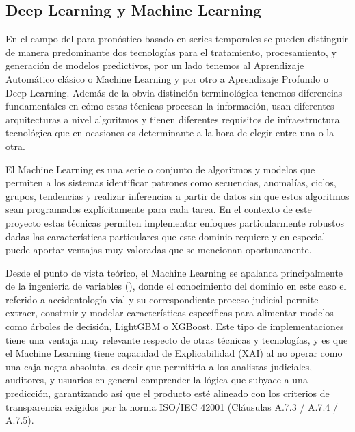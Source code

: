 \subsection{Deep Learning y Machine Learning}\label{deep-learning-y-machine-learning}

En el campo del  para pronóstico basado en series temporales se pueden distinguir de manera predominante dos tecnologías para el tratamiento, procesamiento, y generación de modelos predictivos, por un lado tenemos al Aprendizaje Automático clásico o Machine Learning y por otro a Aprendizaje Profundo o Deep Learning. Además de la obvia distinción terminológica tenemos diferencias fundamentales en cómo estas técnicas procesan la información, usan diferentes arquitecturas a nivel algoritmos y tienen diferentes requisitos de infraestructura tecnológica que en ocasiones es determinante a la hora de elegir entre una o la otra.

El Machine Learning es una serie o conjunto de algoritmos y modelos que permiten a los sistemas identificar patrones como secuencias, anomalías, ciclos, grupos, tendencias y realizar inferencias a partir de datos sin que estos algoritmos sean programados explícitamente para cada tarea. En el contexto de este proyecto estas técnicas permiten implementar enfoques particularmente robustos dadas las características particulares que este dominio requiere y en especial puede aportar ventajas muy valoradas que se mencionan oportunamente.

Desde el punto de vista teórico, el Machine Learning se apalanca principalmente de la ingeniería de variables (), donde el conocimiento del dominio en este caso el referido a accidentología vial y su correspondiente proceso judicial permite extraer, construir y modelar características específicas para alimentar modelos como árboles de decisión, LightGBM o XGBoost. Este tipo de implementaciones tiene una ventaja muy relevante respecto de otras técnicas y tecnologías, y es que el Machine Learning tiene capacidad de Explicabilidad (XAI) al no operar como una caja negra absoluta, es decir que permitiría a los analistas judiciales, auditores, y usuarios en general comprender la lógica que subyace a una predicción, garantizando así que el producto esté alineado con los criterios de transparencia exigidos por la norma ISO/IEC 42001 (Cláusulas A.7.3 / A.7.4 / A.7.5).

